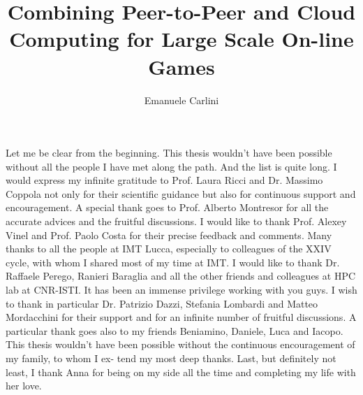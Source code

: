 \documentclass[final,10pt,a5paper]{phdimt}
\title{Combining Peer-to-Peer and Cloud Computing for Large Scale On-line Games}
\author{Emanuele Carlini}
\theoremstyle{definition}
\begin{document}
\graphicspath{
{mainmatter/chapter-Related/}
{mainmatter/graphs/}
{mainmatter/./}
}

\def\vec#1{{\bf #1}}

\renewcommand\baselinestretch{1}
\baselineskip=14pt


\frontmatter

\pagestyle{empty} \maketitle
\makereviewerspage
\pagestyle{plain} 

\tableofcontents
\listoffigures
\listoftables
\clearpage{}

\begin{acknowledgements}

Let me be clear from the beginning. This thesis wouldn't have been possible without all the people I have met along the path. And the list is quite long. I would express my infinite gratitude to Prof. Laura Ricci and Dr. Massimo Coppola not only for their scientific guidance but also for continuous support and encouragement. A special thank goes to Prof. Alberto Montresor for all the accurate advices and the fruitful discussions. I would like to thank Prof. Alexey Vinel and Prof. Paolo Costa for their precise feedback and comments. Many thanks to all the people at IMT Lucca, especially to colleagues of the XXIV cycle, with whom I shared most of my time at IMT. I would like to thank Dr. Raffaele Perego, Ranieri Baraglia and all the other friends and colleagues at HPC lab at CNR-ISTI. It has been an immense privilege working with you guys. I wish to thank in particular Dr. Patrizio Dazzi, Stefania Lombardi and Matteo Mordacchini for their support and for an infinite number of fruitful discussions. A particular thank goes also to my friends Beniamino, Daniele, Luca and Iacopo. This thesis wouldn't have been possible without the continuous encouragement of my family, to whom I ex- tend my most deep thanks. Last, but definitely not least, I thank Anna for being on my side all the time and completing my life with her love.

\end{acknowledgements}
\clearpage{}
\clearpage{}
\end{document}
